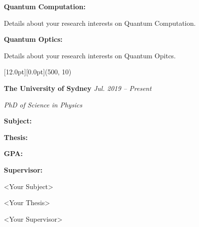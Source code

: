\documentclass[12pt,a4paper]{report}
\begin{document}
    \begin{center}
        \begin{minipage}[t]{460pt}
            {\textbf{Quantum Computation:}} \par
            \quad Details about your research interests on Quantum Computation. \par
            \vspace{4pt}\par
            {\textbf{Quantum Optics:}} \par
            \quad Details about your research interests on Quantum Opitcs. 
        \end{minipage} \par
    \end{center}
    \begin{center}\begin{minipage}[t]{512pt}
        \colorbox{subtitlecolor}{\raisebox{0pt}[12.0pt][0.0pt]{\makebox(500, 10){
            \textcolor{white}{\ttfamily{}\selectfont{}}}}}\end{minipage}\end{center}
    \begin{center}\begin{minipage}[t]{460pt}
        \textbf{The University of Sydney}
        \hfill{\em{Jul. 2019 -- Present}}\par
        \vspace{4pt}\quad\em{PhD of Science in Physics}
    \end{minipage}\end{center}
    \begin{center}
        \begin{minipage}[t]{125pt}
            \qquad \textbf{Subject:} \par
            \qquad \textbf{Thesis:} \par
            \qquad \textbf{GPA:} \par
            \qquad \textbf{Supervisor:} \par
        \end{minipage}
        \begin{minipage}[t]{375pt}
            \quad \textless Your Subject\textgreater \par
            \quad \textless Your Thesis\textgreater \par
             \par
            \quad \textless Your Supervisor\textgreater  \par
        \end{minipage}
    \end{center}
\end{document}
